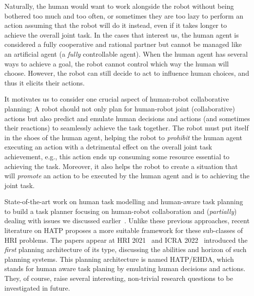 \documentclass[letterpaper]{article} %
\begin{document}
Naturally, the human would want to work alongside the robot without being bothered too much and too often, or sometimes they are too lazy to perform an action assuming that the robot will do it instead, even if it takes longer to achieve the overall joint task. 
In the cases that interest us, the human agent is considered a fully cooperative and rational partner but cannot be managed like an artificial agent (a \textit{fully} controllable agent). When the human agent has several ways to achieve a goal, the robot cannot control which way the human will choose.  However, the robot can still decide to act to influence human choices, and thus it elicits their actions. 

It motivates us to consider one crucial aspect of human-robot collaborative planning: A robot should not only plan for human-robot joint (collaborative) actions but also predict and emulate human decisions and actions (and sometimes their reactions) to seamlessly achieve the task together. 
The robot must put itself in the shoes of the human agent, helping the robot to \textit{prohibit} the human agent executing an action with a detrimental effect on the overall joint task achievement, e.g., this action ends up consuming some resource essential to achieving the task. 
Moreover, it also helps the robot to create a situation that will \textit{promote} an action to be executed by the human agent and is  to achieving the joint task.       


State-of-the-art work on human task modelling and human-aware task planning to build a task planner focusing on human-robot collaboration and (\textit{partially}) dealing with issues we discussed earlier~\cite{alami2006toward,montreuil2007planning,alili2009planning,alili2009task,lallement2014hatp,de2015hatp,lallement2018hatp}.
Unlike these previous approaches, 
recent literature on HATP proposes a more suitable framework for these sub-classes of HRI problems. 
The papers appear at HRI 2021~\cite{BuisanA21} and ICRA 2022~\cite{buisan:hal-03684211} introduced the \textit{first} planning architecture of its type, discussing the abilities and horizon of such planning systems. 
This planning architecture is named HATP/EHDA, which stands for human aware task planing by emulating human decisions and actions. They, of course, raise several interesting, non-trivial research questions to be investigated in future. 
\end{document}
